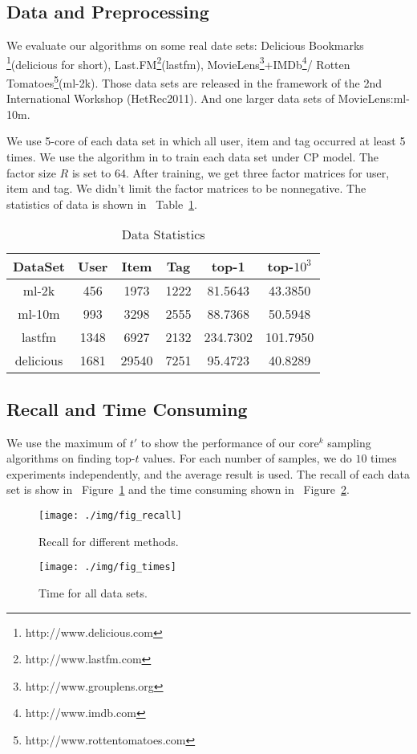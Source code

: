 \documentclass[letterpaper]{article}
\newcommand{\Fig}[1]{Figure~\ref{fig:#1}}
\newcommand{\Table}[1]{Table~\ref{table:#1}}
\begin{document}
\subsection{Data and Preprocessing}
We evaluate our algorithms on some real date sets:
Delicious Bookmarks
\footnote{http://www.delicious.com}(delicious for short),
Last.FM\footnote{http://www.lastfm.com}(lastfm),
MovieLens\footnote{http://www.grouplens.org}+IMDb\footnote{http://www.imdb.com }/
Rotten Tomatoes\footnote{http://www.rottentomatoes.com}(ml-2k).
Those data sets are released in the framework of the 2nd International Workshop (HetRec2011).
And one larger data sets of MovieLens\cite{Harper2015}:ml-10m.

We use 5-core of each data set in which all user, item and tag occurred at least 5 times.
We use the algorithm in \cite{Rendle_RTF} to train each data set under CP model.
The factor size $R$ is set to $64$.
After training, we get three factor matrices for user, item and tag.
We didn't limit the factor matrices to be nonnegative.
The statistics of data is shown in ~\Table{Data}.
\begin{table}[]
  \centering
  \begin{tabular}{|c|c|c|c|c|c|}
    \hline
    DataSet     & User & Item    & Tag    & top-1   & top-$10^3$\\
    \hline
    ml-2k       & 456  &  1973   &  1222  & 81.5643  & 43.3850 \\
    ml-10m      & 993  &  3298   &  2555  & 88.7368 & 50.5948 \\
    lastfm      & 1348 &  6927   &  2132  & 234.7302 & 101.7950\\
    delicious   & 1681 &  29540  &  7251  & 95.4723  & 40.8289 \\
    \hline
  \end{tabular}
  \caption{Data Statistics}
  \label{table:Data}
\end{table}

\subsection{Recall and Time Consuming}
We use the maximum of $t'$
to show the performance of our core$^k$ sampling algorithms on finding top-$t$ values.
For each number of samples, we do $10$ times experiments independently,
and the average result is used.
The recall of each data set is show in ~\Fig{recall}
and the time consuming shown in ~\Fig{times}.
\begin{figure}[H]
  \centering
  \texttt{[image: ./img/fig\_recall]}\\
  \caption{Recall for different methods.}
  \label{fig:recall}
\end{figure}
\begin{figure}[ht]
  \centering
  \texttt{[image: ./img/fig\_times]}\\
  \caption{Time for all data sets.}
  \label{fig:times}
\end{figure}
\end{document}
